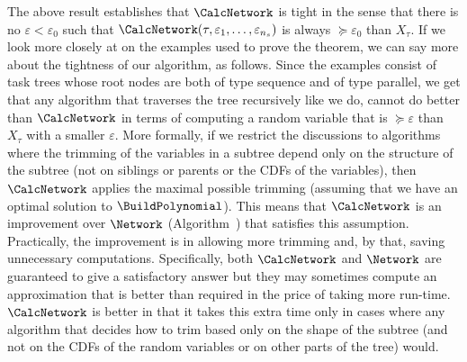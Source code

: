 \documentclass{article}
\begin{document}
The above result establishes that $\CalcNetwork$ is tight in the sense that there is no $\varepsilon < \varepsilon_0$ 
such that $\CalcNetwork(\tau, \varepsilon_1, \dots, \varepsilon_{n_s})$ is always $\succeq{\varepsilon_0}$ than $X_{\tau}$. 
If we look more closely at on the examples used
to prove the theorem, we can say more about the tightness of our algorithm, as follows.
Since the examples consist of task trees whose root nodes are both of
type sequence and of type parallel, we get that any algorithm that traverses the tree
recursively like we do, cannot do better than $\CalcNetwork$ in terms of computing a
random variable that is $\succeq{\varepsilon}$ than $X_{\tau}$ with a smaller $\varepsilon$. 
More formally, if we restrict the discussions to algorithms where the trimming of the variables in a subtree
depend only on the structure of the subtree (not on siblings or parents or the CDFs of the variables), then 
$\CalcNetwork$ applies the maximal possible trimming (assuming that we have an optimal solution to $\BuildPolynomial$). 
This means that $\CalcNetwork$ is an improvement over 
$\Network$ (Algorithm~\label{alg:approx}) that satisfies this assumption. 
Practically, the improvement is in allowing more trimming and, by that, saving unnecessary computations. 
Specifically, both $\CalcNetwork$ and $\Network$ are guaranteed to give a satisfactory answer but they may sometimes compute 
an approximation that is better than required in the price of taking more run-time. $\CalcNetwork$ is better in that it
takes this extra time only in cases where any algorithm that decides how to trim based only on the shape of the subtree 
(and not on the CDFs of the random variables or on other parts of the tree) would.
%
\end{document}
